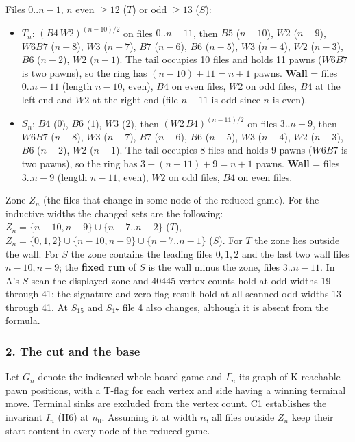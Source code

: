 Files $0..n-1$, $n$ even $\ge12$ ($T$) or odd $\ge13$ ($S$):

\begin{itemize}
\item $T_n$: $(B4\,W2)^{(n-10)/2}$ on files $0..n-11$, then $B5$ ($n-10$), $W2$ ($n-9$), $W6B7$ ($n-8$), $W3$ ($n-7$), $B7$ ($n-6$), $B6$ ($n-5$), $W3$ ($n-4$), $W2$ ($n-3$), $B6$ ($n-2$), $W2$ ($n-1$). The tail occupies 10 files and holds 11 pawns ($W6B7$ is two pawns), so the ring has $(n-10)+11=n+1$ pawns. \textbf{Wall} = files $0..n-11$ (length $n-10$, even), $B4$ on even files, $W2$ on odd files, $B4$ at the left end and $W2$ at the right end (file $n-11$ is odd since $n$ is even).
\item $S_n$: $B4$ ($0$), $B6$ ($1$), $W3$ ($2$), then $(W2\,B4)^{(n-11)/2}$ on files $3..n-9$, then $W6B7$ ($n-8$), $W3$ ($n-7$), $B7$ ($n-6$), $B6$ ($n-5$), $W3$ ($n-4$), $W2$ ($n-3$), $B6$ ($n-2$), $W2$ ($n-1$). The tail occupies 8 files and holds 9 pawns ($W6B7$ is two pawns), so the ring has $3+(n-11)+9=n+1$ pawns. \textbf{Wall} = files $3..n-9$ (length $n-11$, even), $W2$ on odd files, $B4$ on even files.
\end{itemize}
Zone $Z_n$ (the files that change in some node of the reduced game). For the inductive widths the changed sets are the following: $Z_n=\{n-10,n-9\}\cup\{n-7..n-2\}$ ($T$), $Z_n=\{0,1,2\}\cup\{n-10,n-9\}\cup\{n-7..n-1\}$ ($S$). For $T$ the zone lies outside the wall. For $S$ the zone contains the leading files $0,1,2$ and the last two wall files $n-10,n-9$; the \textbf{fixed run} of $S$ is the wall minus the zone, files $3..n-11$. In A's $S$ scan the displayed zone and 40445-vertex counts hold at odd widths 19 through 41; the signature and zero-flag result hold at all scanned odd widths 13 through 41. At $S_{15}$ and $S_{17}$ file 4 also changes, although it is absent from the formula.

\subsubsection*{2. The cut and the base}
Let $G_n$ denote the indicated whole-board game and $\Gamma_n$ its graph of K-reachable pawn positions, with a T-flag for each vertex and side having a winning terminal move. Terminal sinks are excluded from the vertex count. C1 establishes the invariant $I_n$ (H6) at $n_0$. Assuming it at width $n$, all files outside $Z_n$ keep their start content in every node of the reduced game.

